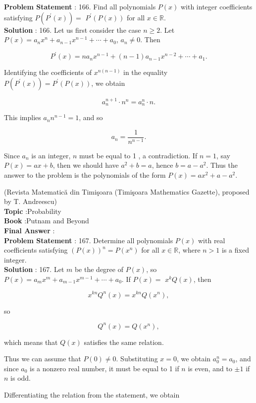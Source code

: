 \documentclass[10pt]{article}
\begin{document}
\textbf{Problem Statement} :
166. Find all polynomials $P(x)$ with integer coefficients satisfying $P\left(P^{\prime}(x)\right)=$ $P^{\prime}(P(x))$ for all $x \in \mathbb{R}$.
\\
\textbf{Solution} :
166. Let us first consider the case $n \geq 2$. Let $P(x)=a_{n} x^{n}+a_{n-1} x^{n-1}+\cdots+a_{0}$, $a_{n} \neq 0$. Then

$$
P^{\prime}(x)=n a_{n} x^{n-1}+(n-1) a_{n-1} x^{n-2}+\cdots+a_{1} .
$$

Identifying the coefficients of $x^{n(n-1)}$ in the equality $P\left(P^{\prime}(x)\right)=P^{\prime}(P(x))$, we obtain

$$
a_{n}^{n+1} \cdot n^{n}=a_{n}^{n} \cdot n .
$$

This implies $a_{n} n^{n-1}=1$, and so

$$
a_{n}=\frac{1}{n^{n-1}} .
$$

Since $a_{n}$ is an integer, $n$ must be equal to 1 , a contradiction. If $n=1$, say $P(x)=a x+b$, then we should have $a^{2}+b=a$, hence $b=a-a^{2}$. Thus the answer to the problem is the polynomials of the form $P(x)=a x^{2}+a-a^{2}$.

(Revista Matematică din Timişoara (Timişoara Mathematics Gazette), proposed by T. Andreescu)
\\
\textbf{Topic} :Probability\\
\textbf{Book} :Putnam and Beyond\\
\textbf{Final Answer} :\\


\textbf{Problem Statement} :
167. Determine all polynomials $P(x)$ with real coefficients satisfying $(P(x))^{n}=P\left(x^{n}\right)$ for all $x \in \mathbb{R}$, where $n>1$ is a fixed integer. 
\\
\textbf{Solution} :
167. Let $m$ be the degree of $P(x)$, so $P(x)=a_{m} x^{m}+a_{m-1} x^{m-1}+\cdots+a_{0}$. If $P(x)=$ $x^{k} Q(x)$, then

$$
x^{k n} Q^{n}(x)=x^{k n} Q\left(x^{n}\right),
$$

so

$$
Q^{n}(x)=Q\left(x^{n}\right),
$$

which means that $Q(x)$ satisfies the same relation.

Thus we can assume that $P(0) \neq 0$. Substituting $x=0$, we obtain $a_{0}^{n}=a_{0}$, and since $a_{0}$ is a nonzero real number, it must be equal to 1 if $n$ is even, and to $\pm 1$ if $n$ is odd.

Differentiating the relation from the statement, we obtain
\end{document}
